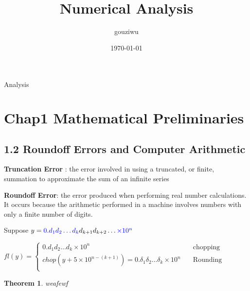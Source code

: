 \documentclass[11pt]{article}
\author{gouziwu}
\date{\today}
\title{Numerical Analysis}
\newtheorem{theorem}{Theorem}
\begin{document}
\maketitle
\tableofcontents

Analysis


\section{Chap1 Mathematical Preliminaries}
\label{sec:orgbf4170b}
\subsection{1.2 Roundoff Errors and Computer Arithmetic}
\label{sec:org6c0ba58}
\textbf{Truncation Error} : the error involved in using a truncated, or finite, summation to
approximate the sum of an infinite series 

\textbf{Roundoff Error}: the error produced when performing real number calculations.
 It occurs because the arithmetic performed in a machine involves numbers
 with only a finite number of digits. 


Suppose \(y=\textcolor{blue}{0.d_1d_2\dots
    d_k}d_{k+1}d_{k+2}\dots\textcolor{blue}{\times 10^n{}}\) \par
\(fl(y)=\begin{cases} 0.d_1d_2\dots d_k\times 10^n&\quad\text{chopping}\\
    chop(y+5\times 10^{n-(k+1)})=0.\delta_1\delta_2\dots \delta_k\times
    10^n&\quad\text{Rounding}\\\end{cases}\)


\begin{theorem} weafewf \end{theorem}
\end{document}
